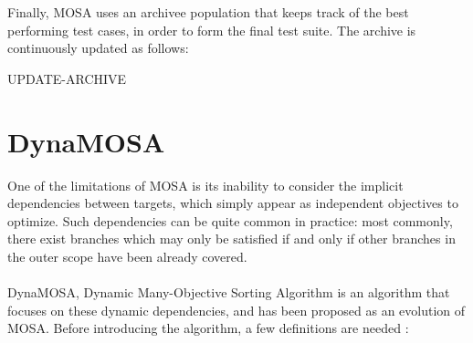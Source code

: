 \newpage
Finally, MOSA uses an archivee population that keeps track of the best performing test cases, in order to form the final test suite. The archive is continuously updated as follows:

\begin{algorithm}[H]
    \caption{UPDATE-ARCHIVE}


    \DontPrintSemicolon   

\end{algorithm}





\newpage
\section{DynaMOSA}
One of the limitations of MOSA is its inability to consider the implicit dependencies between targets, which simply appear as independent objectives to optimize. Such dependencies can be quite common in practice: most commonly, there exist branches which may only be satisfied if and only if other branches in the outer scope have been already covered. 
\\\\
DynaMOSA, Dynamic Many-Objective Sorting Algorithm \cite{DBLP:journals/tse/PanichellaKT18} is an algorithm that focuses on these dynamic dependencies, and has been proposed as an evolution of MOSA. 
Before introducing the algorithm, a few definitions are needed \cite{DBLP:journals/tse/PanichellaKT18}:

